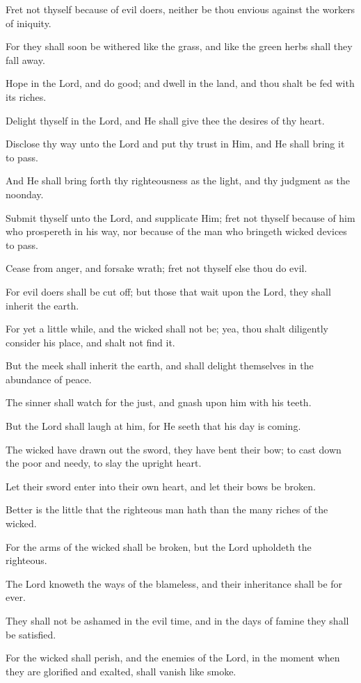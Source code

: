 Fret not thyself because of evil doers, neither be thou envious against the workers of iniquity.

For they shall soon be withered like the grass, and like the green herbs shall they fall away.

Hope in the Lord, and do good; and dwell in the land, and thou shalt be fed with its riches.

Delight thyself in the Lord, and He shall give thee the desires of thy heart.

Disclose thy way unto the Lord and put thy trust in Him, and He shall bring it to pass.

And He shall bring forth thy righteousness as the light, and thy judgment as the noonday.

Submit thyself unto the Lord, and supplicate Him; fret not thyself because of him who prospereth in his way, nor because of the man who bringeth wicked devices to pass.

Cease from anger, and forsake wrath; fret not thyself else thou do evil.

For evil doers shall be cut off; but those that wait upon the Lord, they shall inherit the earth.

For yet a little while, and the wicked shall not be; yea, thou shalt diligently consider his place, and shalt not find it.

But the meek shall inherit the earth, and shall delight themselves in the abundance of peace.

The sinner shall watch for the just, and gnash upon him with his teeth.

But the Lord shall laugh at him, for He seeth that his day is coming.

The wicked have drawn out the sword, they have bent their bow; to cast down the poor and needy, to slay the upright heart.

Let their sword enter into their own heart, and let their bows be broken.

Better is the little that the righteous man hath than the many riches of the wicked.

For the arms of the wicked shall be broken, but the Lord upholdeth the righteous.

The Lord knoweth the ways of the blameless, and their inheritance shall be for ever.

They shall not be ashamed in the evil time, and in the days of famine they shall be satisfied.

For the wicked shall perish, and the enemies of the Lord, in the moment when they are glorified and exalted, shall vanish like smoke.

